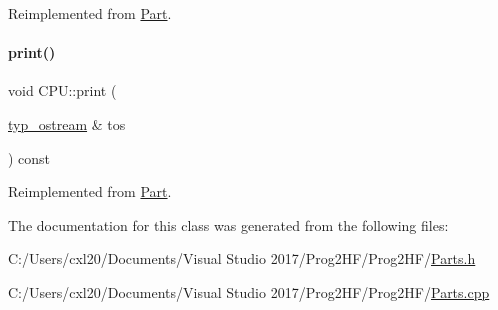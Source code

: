 Reimplemented from \mbox{\hyperlink{class_part_aa602d876151b63db72cf8f666847a8cd}{Part}}.

\mbox{\label{class_c_p_u_aa2cf81d7f0005da72c7a99b1b9459c27}} 
\paragraph{\texorpdfstring{print()}{print()}\hspace{0.1cm}{\footnotesize\ttfamily [4/4]}}
{\footnotesize\ttfamily void C\+P\+U\+::print (\begin{DoxyParamCaption}\item[{\mbox{\hyperlink{structtyp__ostream}{typ\+\_\+ostream}} \&}]{tos }\end{DoxyParamCaption}) const\hspace{0.3cm}{\ttfamily [virtual]}}



Reimplemented from \mbox{\hyperlink{class_part_ab6396030e8b7a724731a8b54bd4942fc}{Part}}.



The documentation for this class was generated from the following files\+:\begin{DoxyCompactItemize}
\item 
C\+:/\+Users/cxl20/\+Documents/\+Visual Studio 2017/\+Prog2\+H\+F/\+Prog2\+H\+F/\mbox{\hyperlink{_parts_8h}{Parts.\+h}}\item 
C\+:/\+Users/cxl20/\+Documents/\+Visual Studio 2017/\+Prog2\+H\+F/\+Prog2\+H\+F/\mbox{\hyperlink{_parts_8cpp}{Parts.\+cpp}}\end{DoxyCompactItemize}
